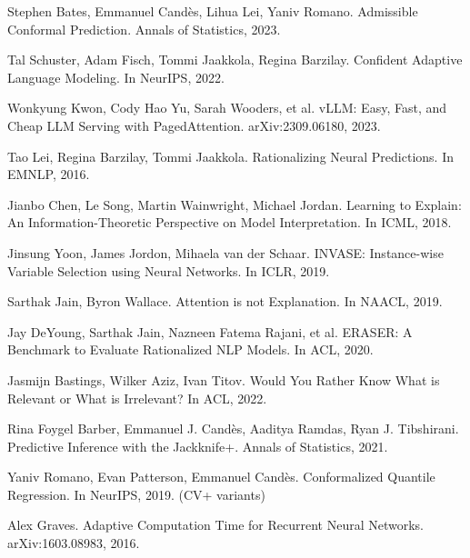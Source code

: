 \documentclass[11pt]{article}
\begin{document}
\begin{thebibliography}{99}
Stephen Bates, Emmanuel Candès, Lihua Lei, Yaniv Romano. Admissible Conformal Prediction. Annals of Statistics, 2023.

Tal Schuster, Adam Fisch, Tommi Jaakkola, Regina Barzilay. Confident Adaptive Language Modeling. In NeurIPS, 2022.

Wonkyung Kwon, Cody Hao Yu, Sarah Wooders, et al. vLLM: Easy, Fast, and Cheap LLM Serving with PagedAttention. arXiv:2309.06180, 2023.

Tao Lei, Regina Barzilay, Tommi Jaakkola. Rationalizing Neural Predictions. In EMNLP, 2016.

Jianbo Chen, Le Song, Martin Wainwright, Michael Jordan. Learning to Explain: An Information-Theoretic Perspective on Model Interpretation. In ICML, 2018.

Jinsung Yoon, James Jordon, Mihaela van der Schaar. INVASE: Instance-wise Variable Selection using Neural Networks. In ICLR, 2019.

Sarthak Jain, Byron Wallace. Attention is not Explanation. In NAACL, 2019.

Jay DeYoung, Sarthak Jain, Nazneen Fatema Rajani, et al. ERASER: A Benchmark to Evaluate Rationalized NLP Models. In ACL, 2020.

Jasmijn Bastings, Wilker Aziz, Ivan Titov. Would You Rather Know What is Relevant or What is Irrelevant? In ACL, 2022.

Rina Foygel Barber, Emmanuel J. Candès, Aaditya Ramdas, Ryan J. Tibshirani. Predictive Inference with the Jackknife+. Annals of Statistics, 2021.

Yaniv Romano, Evan Patterson, Emmanuel Candès. Conformalized Quantile Regression. In NeurIPS, 2019. (CV+ variants)

Alex Graves. Adaptive Computation Time for Recurrent Neural Networks. arXiv:1603.08983, 2016.

\end{thebibliography}
\end{document}
